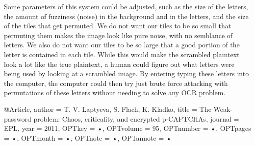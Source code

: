 \documentclass[12pt]{article}
\begin{document}

Some parameters of this system could be adjusted, such as the size of the letters, the amount of fuzziness (noise) in the background and in the letters, and the size of the tiles that get permuted. We do not want our tiles to be so small that permuting them makes the image look like pure noise, with no semblance of letters. We also do not want our tiles to be so large that a good portion of the letter is contained in each tile. While this would make the scrambled plaintext look a lot like the true plaintext, a human could figure out what letters were being used by looking at a scrambled image. By entering typing these letters into the computer, the computer could then try just brute force attacking with permutations of these letters without needing to solve any OCR problem.






@Article{,
author = {T. V. Laptyeva, S. Flach, K. Kladko},
title = {The Weak-password problem: Chaos, criticality, and encrypted p-CAPTCHAs},
journal = {EPL},
year = {2011},
OPTkey = {•},
OPTvolume = {95},
OPTnumber = {•},
OPTpages = {•},
OPTmonth = {•},
OPTnote = {•},
OPTannote = {•}
}
\begin{thebibliography}

\end{thebibliography}
\end{document}
